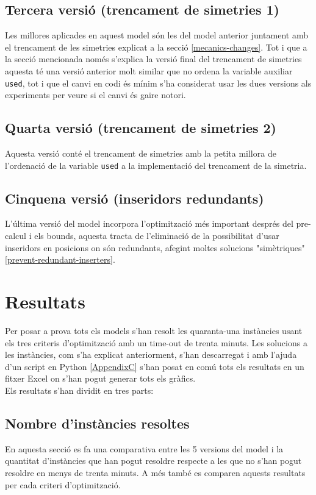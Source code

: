 \subsection{Tercera versió (trencament de simetries 1)}
Les millores aplicades en aquest model són les del model anterior juntament amb el trencament de les simetries explicat a la secció \ref{mecanics-changes}. Tot i que a la secció mencionada només s'explica la versió final del trencament de simetries aquesta té una versió anterior molt similar que no ordena la variable auxiliar \texttt{used}, tot i que el canvi en codi és mínim s'ha considerat usar les dues versions als experiments per veure si el canvi és gaire notori.

\subsection{Quarta versió (trencament de simetries 2)}
Aquesta versió conté el trencament de simetries amb la petita millora de l'ordenació de la variable \texttt{used} a la implementació del trencament de la simetria.

\subsection{Cinquena versió (inseridors redundants)}
L'última versió del model incorpora l'optimització més important després del pre-calcul i els bounds, aquesta tracta de l'eliminació de la possibilitat d'usar inseridors en posicions on són redundants, afegint moltes solucions "simètriques" \ref{prevent-redundant-inserters}.

\section{Resultats}
Per posar a prova tots els models s'han resolt les quaranta-una instàncies usant els tres criteris d'optimització amb un time-out de trenta minuts. Les solucions a les instàncies, com s'ha explicat anteriorment, s'han descarregat i amb l'ajuda d'un script en Python \ref{AppendixC} s'han posat en comú tots els resultats en un fitxer Excel on s'han pogut generar tots els gràfics.\\
Els resultats s'han dividit en tres parts:
\subsection{Nombre d'instàncies resoltes}\label{subsec:instances-solved}
En aquesta secció es fa una comparativa entre les 5 versions del model i la quantitat d'instàncies que han pogut resoldre respecte a les que no s'han pogut resoldre en menys de trenta minuts. A més també es comparen aquests resultats per cada criteri d'optimització.

